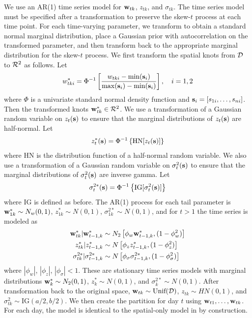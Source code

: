 \documentclass[useAMS,usenatbib,referee]{biom}
\begin{document}
We use an AR(1) time series model for $\mbox{\bf w}_{tk}$, $z_{tk}$, and $\sigma_{tk}$.
The time series model must be specified after a transformation to preserve the skew-$t$ process at each time point.
For each time-varying parameter, we transform to obtain a standard normal marginal distribution, place a Gaussian prior with autocorrelation on the transformed parameter, and then transform back to the appropriate marginal distribution for the skew-$t$ process.
We first transform the spatial knots from $\calD$ to $\calR^2$ as follows.
Let
\begin{align} \label{steq:wstar}
  w^*_{tki} = \Phi^{-1}\left[ \frac{ w_{tki} - \min(\bs_i)}{ \max(\bs_i) - \min(\bs_i) } \right], \quad i = 1, 2
\end{align}
where $\Phi$ is a univariate standard normal density function and $\mbox{\bf s}_i = [s_{1i}, \ldots, s_{ni}]$.
Then the transformed knots $\bw^*_{tk} \in \calR^2$.
We use a transformation of a Gaussian random variable on $z_{t}(\mbox{\bf s})$ to ensure that the marginal distributions of $z_t(\mbox{\bf s})$ are half-normal.
Let
\begin{align} \label{steq:zstar}
  z^*_t(\bs) = \Phi^{-1}\left\{ \text{HN}[z_t(\bs)] \right\}
\end{align}
where HN is the distribution function of a half-normal random variable.
We also use a transformation of a Gaussian random variable on $\sigma^2_t(\mbox{\bf s})$ to ensure that the marginal distributions of $\sigma^2_t(\mbox{\bf s})$ are inverse gamma.
Let
\begin{align} \label{steq:sigmastar}
  \sigma^{2*}_t(\bs) =\Phi^{-1}\left\{ \text{IG}[\sigma^2_t(\bs)] \right\}
\end{align}
where IG is defined as before.
The AR(1) process for each tail parameter is $\mbox{\bf w}^*_{1k} \sim N_w(0, 1)$, $z^*_{1k} \sim N(0, 1)$, $\sigma^{2*}_{1k} \sim N(0, 1)$, and for $t > 1$ the time series is modeled as
\begin{align}
  \bw^*_{tk} | \bw^*_{t-1, k} &\sim N_2\left[\phi_w \bw^*_{t-1, k}, (1 - \phi_w^2) \right] \label{steq:ts-wstar}\\
  z^*_{tk} | z^*_{t-1, k} &\sim N \left[\phi_z z^*_{t-1, k}, (1 - \phi_z^2)\right] \label{steq:ts-zstar} \\
  \sigma^{2*}_{tk} | \sigma^{2*}_{t-1, k} &\sim N \left[\phi_\sigma \sigma^{2*}_{t-1, k}, (1 - \phi_\sigma^2) \right] \label{steq:ts-sigmastar}
\end{align}
where $|\phi_w|$, $|\phi_z|$, $|\phi_\sigma| < 1$.
These are stationary time series models with marginal distributions \hbox{$\mbox{\bf w}^*_{k} \sim N_2(0, 1)$}, \hbox{$z^*_{k} \sim N(0, 1)$}, and \hbox{$\sigma^{2*}_{k} \sim N(0, 1)$}.
After transformation back to the original space, $\bw_{tk} \sim \text{Unif}(\calD)$, $z_{tk} \sim HN(0, 1)$, and $\sigma^2_{tk} \sim \text{IG}(a / 2, b / 2)$.
We then create the partition for day $t$ using $\mbox{\bf w}_{t1}, \ldots, \mbox{\bf w}_{tk}$.
For each day, the model is identical to the spatial-only model in  by construction.
\end{document}
